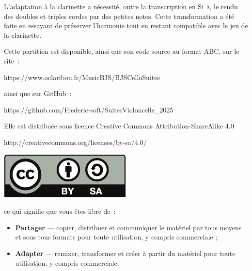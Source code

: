\documentclass[a4paper,twoside]{article}
\renewenvironment{quote}{%
  \list{}{%
    \leftmargin=0.5cm   %
    \rightmargin=\leftmargin
  }%
  \item\relax
}{\endlist}
\newcommand{\includerh}[3][0pt]{%
  \raisebox{#1}{\texttt{[image: \#3]}}%
}
\begin{document}
L'adaptation à la clarinette a nécessité, outre la transcription en Si~\(\flat\), le rendu des doubles 
et triples cordes par des petites notes. Cette transformation a été faite en essayant de préserver
l'harmonie tout en restant compatible avec le jeu de la clarinette.

\bigskip

Cette partition est disponible, ainsi que son code source au format ABC, sur le site~:

\smallskip

\centerline{https://www.oclaribou.fr/MusicBJS/BJSCelloSuites}

\smallskip

ainsi que sur GitHub~:

\smallskip

\centerline{https://github.com/Frederic-soft/SuitesVioloncelle\_2025}

\bigskip

Elle est distribuée sous licence Creative Commons Attribution-ShareAlike 4.0

\centerline{http://creativecommons.org/licenses/by-sa/4.0/}

\medskip

\centerline{\includegraphics{inc/by-sa}}

\medskip

ce qui signifie que vous êtes libre de~:
\begin{quote}
\begin{itemize}
  \item[{\includerh[-2ex]{5ex}{inc/share}}] \textbf{Partager} --- copier, distribuer 
  et communiquer le matériel par tous moyens et sous tous formats pour toute utilisation, 
  y compris commerciale ;
  
  \item[{\includerh[-2ex]{5ex}{inc/remix}}] \textbf{Adapter} --- remixer, transformer et 
  créer à partir du matériel pour toute utilisation, y compris commerciale.
\end{itemize}
\end{quote}
\end{document}
